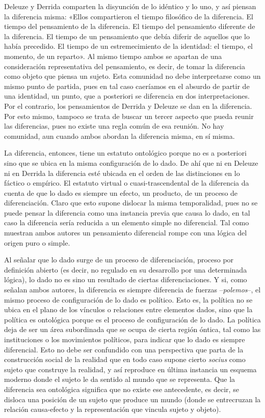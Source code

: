 Deleuze y Derrida comparten la disyunción de lo idéntico y lo uno, y así piensan la diferencia misma: «Ellos compartieron el tiempo filosófico de la diferencia. El tiempo del pensamiento de la diferencia. El tiempo del pensamiento diferente de la diferencia. El tiempo de un pensamiento que debía diferir de aquellos que lo había precedido. El tiempo de un estremecimiento de la identidad: el tiempo, el momento, de un reparto». Al mismo tiempo ambos se apartan de una consideración representativa del pensamiento, es decir, de tomar la diferencia como objeto que piensa un sujeto. Esta comunidad no debe interpretarse como un mismo punto de partida, pues en tal caso caeríamos en el absurdo de partir de una identidad, un punto, que a posteriori se diferencia en dos interpretaciones. Por el contrario, los pensamientos de Derrida y Deleuze se dan en la diferencia. Por esto mismo, tampoco se trata de buscar un tercer aspecto que pueda reunir las diferencias, pues no existe una regla común de esa reunión. No hay comunidad, aun cuando ambos abordan la diferencia misma, en sí misma.

La diferencia, entonces, tiene un estatuto ontológico porque no es a posteriori sino que se ubica en la misma configuración de lo dado. De ahí que ni en Deleuze ni en Derrida la diferencia esté ubicada en el orden de las distinciones en lo fáctico o empírico. El estatuto virtual o cuasi-trascendental de la diferencia da cuenta de que lo dado es siempre un efecto, un producto, de un proceso de diferenciación. Claro que esto supone dislocar la misma temporalidad, pues no se puede pensar la diferencia como una instancia previa que causa lo dado, en tal caso la diferencia sería reducida a un elemento simple no diferencial. Tal como muestran ambos autores un pensamiento diferencial rompe con una lógica del origen puro o simple.

Al señalar que lo dado surge de un proceso de diferenciación, proceso por definición abierto (es decir, no regulado en su desarrollo por una determinada lógica), lo dado no es sino un resultado de ciertas diferenciaciones. Y si, como señalan ambos autores, la diferencia es siempre diferencia de fuerzas --\emph{polemos}--, el mismo proceso de configuración de lo dado es político. Esto es, la política no se ubica en el plano de los vínculos o relaciones entre elementos dados, sino que la política es ontológica porque es el proceso de configuración de lo dado. La política deja de ser un área subordinada que se ocupa de cierta región óntica, tal como las instituciones o los movimientos políticos, para indicar que lo dado es siempre diferencial. Esto no debe ser confundido con una perspectiva que parta de la construcción social de la realidad que en todo caso supone cierto \emph{socius} como sujeto que construye la realidad, y así reproduce en última instancia un esquema moderno donde el sujeto le da sentido al mundo que se representa. Que la diferencia sea ontológica significa que no existe ese antecedente, es decir, se disloca una posición de un sujeto que produce un mundo (donde se entrecruzan la relación causa-efecto y la representación que vincula sujeto y objeto).

